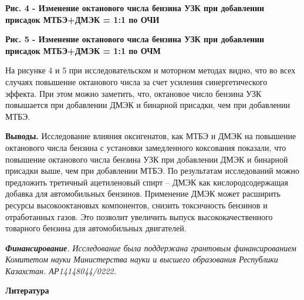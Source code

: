 % 

{\bfseries Рис. 4 - Изменение октанового числа бензина УЗК при добавлении
присадок МТБЭ+ДМЭК = 1:1 по ОЧИ}

{\bfseries Рис. 5 - Изменение октанового числа бензина УЗК при добавлении
присадок МТБЭ+ДМЭК = 1:1 по ОЧМ}

На рисунке 4 и 5 при исследовательском и моторном методах видно, что во
всех случаях повышение октанового числа за счет усиления
синергетического эффекта. При этом можно заметить, что, октановое число
бензина УЗК повышается при добавлении ДМЭК и бинарной присадки, чем при
добавлении МТБЭ.

{\bfseries Выводы.} Исследование влияния оксигенатов, как МТБЭ и ДМЭК на
повышение октанового числа бензина с установки замедленного коксования
показали, что повышение октанового числа бензина УЗК при добавлении ДМЭК
и бинарной присадки выше, чем при добавлении МТБЭ. По результатам
исследований можно предложить третичный ацетиленовый спирт -- ДМЭК как
кислородсодержащая добавка для автомобильных бензинов. Применение ДМЭК
может расширить ресурсы высокооктановых компонентов, снизить токсичность
бензинов и отработанных газов. Это позволит увеличить выпуск
высококачественного товарного бензина для автомобильных двигателей.

\emph{{\bfseries Финансирование}. Исследование была поддержана грантовым
финансированием Комитетом науки Министерства науки и высшего образования
Республики Казахстан. АР14148044/0222.}

\begin{center}
{\bfseries Литература}
\end{center}


